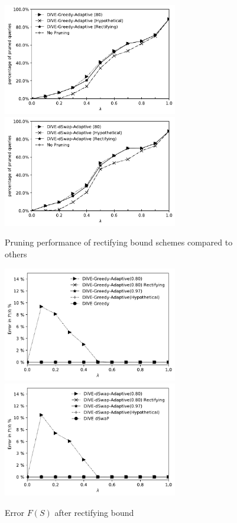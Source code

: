\documentclass{article}
\begin{document}
\begin{figure}
	\begin{center}
		\includegraphics[width=3.0in]{figures/pruning_performance_greedy_rectifying}
		\includegraphics[width=3.0in]{figures/pruning_performance_dswap_rectifying}
		\caption{Pruning performance of rectifying bound schemes compared to others}
		\label{fig:rectifying_bound_greedy_dswap}
	\end{center}
\end{figure}

\begin{figure}
	\begin{center}
		\includegraphics[width=3.0in]{figures/rectifiying_error_f_s_greedy}
		\includegraphics[width=3.0in]{figures/rectifiying_error_f_s_dswap}
		\caption{Error $F(S)$ after rectifying bound}
		\label{fig:error_fs_adaptive}
	\end{center}
\end{figure}
\end{document}
